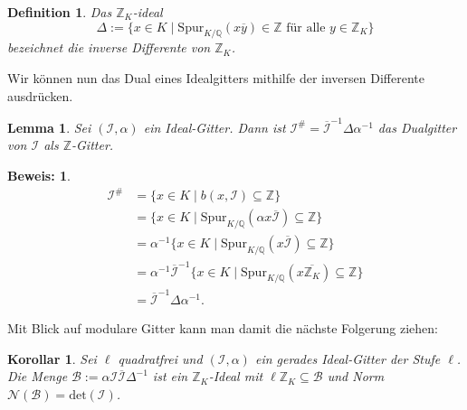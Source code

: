 \documentclass[12pt,a4paper,halfparskip,headsepline,bibtotocnumbered]{scrreprt}
\theoremstyle{nummermitklammern}
\newtheorem{definition}[defsatzusw]{Definition}
\newtheorem{lemma}[defsatzusw]{Lemma}
\newtheorem{korollar}[defsatzusw]{Korollar}
\theoremstyle{nonumberbreak}
\newtheorem{beweis}{Beweis:}
\newcommand{\Z}{\mathbb{Z}}
\newcommand{\Q}{\mathbb{Q}}
\newcommand{\B}{\mathcal{B}}
\newcommand{\No}{\mathcal{N}}
\newcommand{\I}{\mathcal{I}}
\begin{document}
\begin{framed}
	\begin{definition}
		Das $\Z_K$-ideal
		\begin{equation*}
			\Delta := \lbrace x \in K \mid \text{Spur}_{K/\Q}(x \overline{y}) \in \Z \text{ für alle } y \in \Z_K \rbrace
		\end{equation*}
		bezeichnet die \textit{inverse Differente} von $\Z_K$.
	\end{definition}
\end{framed}

Wir können nun das Dual eines Idealgitters mithilfe der inversen Differente ausdrücken.

\begin{framed}
	\begin{lemma}\label{lem:idealdual}
		Sei $(\I, \alpha)$ ein Ideal-Gitter. Dann ist $\I^\# = \overline{\I}^{-1} \Delta \alpha^{-1}$ das Dualgitter von $\I$ als $\Z$-Gitter.
	\end{lemma}
\end{framed}

\begin{beweis}
	\begin{align*}
	\I^\# &= \lbrace x \in K \mid b(x,\I) \subseteq \Z \rbrace\\
	&= \lbrace x \in K \mid \text{Spur}_{K/\Q}(\alpha x \overline{\I}) \subseteq \Z \rbrace\\
	&= \alpha^{-1} \lbrace x \in K \mid \text{Spur}_{K/\Q}(x \overline{\I}) \subseteq \Z\rbrace\\
	&= \alpha^{-1} \overline{\I}^{-1} \lbrace x \in K \mid \text{Spur}_{K/\Q}(x \overline{\Z_K}) \subseteq \Z\rbrace\\
	&= \overline{\I}^{-1} \Delta \alpha^{-1}.
	\end{align*}
\end{beweis}

Mit Blick auf modulare Gitter kann man damit die nächste Folgerung ziehen:

\begin{framed}
	\begin{korollar}
		Sei $\ell$ quadratfrei und $(\I, \alpha)$ ein gerades Ideal-Gitter der Stufe $\ell$. Die Menge $\B := \alpha \I \overline{\I} \Delta^{-1}$ ist ein $\Z_K$-Ideal mit $\ell \Z_K \subseteq \B$ und Norm $\No(\B) = \text{det}(\I)$.
	\end{korollar}
\end{framed}
\end{document}
